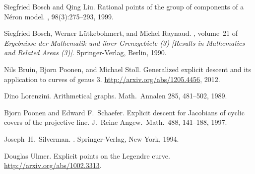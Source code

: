\documentclass[reqno]{amsart}
\theoremstyle{definition}
\theoremstyle{remark}
\begin{document}
\begin{thebibliography}{BLR90}

Siegfried Bosch and Qing Liu.
\newblock Rational points of the group of components of a {N}\'eron model.
, 98(3):275--293, 1999.

Siegfried Bosch, Werner L{\"u}tkebohmert, and Michel Raynaud.
, volume~21 of {\em Ergebnisse der Mathematik und
  ihrer Grenzgebiete (3) [Results in Mathematics and Related Areas (3)]}.
\newblock Springer-Verlag, Berlin, 1990.

Nils Bruin, Bjorn Poonen, and Michael Stoll.
\newblock Generalized explicit descent and its application to curves of genus 3.
\newblock \url{http://arxiv.org/abs/1205.4456}, 2012.



Dino Lorenzini.
\newblock Arithmetical graphs.
\newblock Math.\ Annalen 285, 481--502, 1989.

Bjorn Poonen and Edward F.\ Schaefer.
\newblock  Explicit descent for Jacobians of cyclic covers of the projective line.
\newblock   J.\ Reine Angew.\ Math.\ 488, 141--188, 1997.

Joseph~H.\ Silverman.
.
\newblock Springer-Verlag, New York, 1994.

Douglas Ulmer.
\newblock Explicit points on the Legendre curve.
\newblock \url{http://arxiv.org/abs/1002.3313}.

\end{thebibliography}
\end{document}
